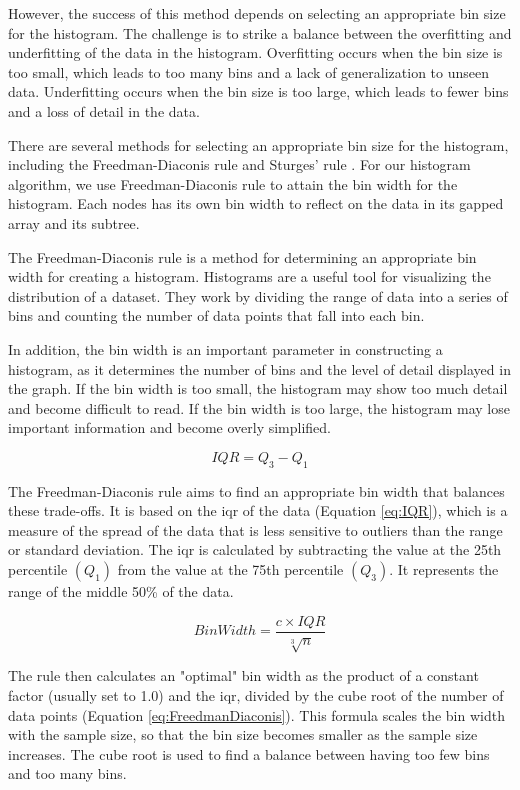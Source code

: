 However, the success of this method depends on selecting an appropriate bin size for the histogram. The challenge is to strike a balance between the overfitting and underfitting of the data in the histogram. Overfitting occurs when the bin size is too small, which leads to too many bins and a lack of generalization to unseen data. Underfitting occurs when the bin size is too large, which leads to fewer bins and a loss of detail in the data.

There are several methods for selecting an appropriate bin size for the histogram, including the Freedman-Diaconis rule and Sturges' rule \cite{sahann2021histogram}. For our histogram algorithm, we use Freedman-Diaconis rule to attain the bin width for the histogram.
Each nodes has its own bin width to reflect on the data in its gapped array and its subtree. 

The Freedman-Diaconis rule is a method for determining an appropriate bin width for creating a histogram. Histograms are a useful tool for visualizing the distribution of a dataset. They work by dividing the range of data into a series of bins and counting the number of data points that fall into each bin. 

In addition, the bin width is an important parameter in constructing a histogram, as it determines the number of bins and the level of detail displayed in the graph. If the bin width is too small, the histogram may show too much detail and become difficult to read. If the bin width is too large, the histogram may lose important information and become overly simplified.

\begin{equation}\label{eq:IQR}
    IQR = Q_3 - Q_1
\end{equation}


The Freedman-Diaconis rule aims to find an appropriate bin width that balances these trade-offs. It is based on the \acrfull{iqr} of the data (Equation \ref{eq:IQR}), which is a measure of the spread of the data that is less sensitive to outliers than the range or standard deviation. The \acrshort{iqr} is calculated by subtracting the value at the 25th percentile $(Q_1)$ from the value at the 75th percentile $(Q_3)$. It represents the range of the middle 50\% of the data.

\begin{equation}\label{eq:FreedmanDiaconis}
    Bin Width = \frac{c\times IQR}{\sqrt[3]{n}}
\end{equation}

The rule then calculates an "optimal" bin width as the product of a constant factor (usually set to 1.0) and the \acrshort{iqr}, divided by the cube root of the number of data points (Equation \ref{eq:FreedmanDiaconis}). This formula scales the bin width with the sample size, so that the bin size becomes smaller as the sample size increases. The cube root is used to find a balance between having too few bins and too many bins.

